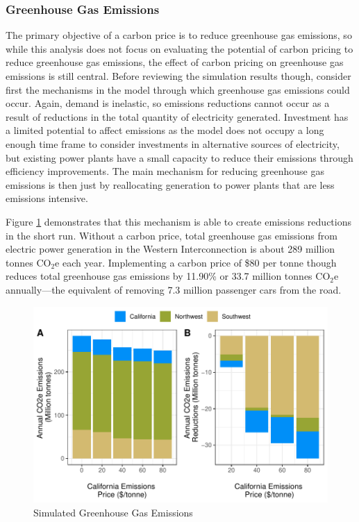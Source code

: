 \subsubsection*{Greenhouse Gas Emissions}

The primary objective of a carbon price is to reduce greenhouse gas emissions, so while this analysis does not focus on evaluating the potential of carbon pricing to reduce greenhouse gas emissions, the effect of carbon pricing on greenhouse gas emissions is still central. Before reviewing the simulation results though, consider first the mechanisms in the model through which greenhouse gas emissions could occur. Again, demand is inelastic, so emissions reductions cannot occur as a result of reductions in the total quantity of electricity generated. Investment has a limited potential to affect emissions as the model does not occupy a long enough time frame to consider investments in alternative sources of electricity, but existing power plants have a small capacity to reduce their emissions through efficiency improvements. The main mechanism for reducing greenhouse gas emissions is then just by reallocating generation to power plants that are less emissions intensive. 

Figure \ref{sim_co2e_bca} demonstrates that this mechanism is able to create emissions reductions in the short run. Without a carbon price, total greenhouse gas emissions from electric power generation in the Western Interconnection is about 289 million tonnes CO$_2$e each year. Implementing a carbon price of \$80 per tonne though reduces total greenhouse gas emissions by 11.90\% or 33.7 million tonnes CO$_2$e annually---the equivalent of removing 7.3 million passenger cars from the road. 

\begin{figure}
    \centering
    \caption{Simulated Greenhouse Gas Emissions\label{sim_co2e_bca}}
    \includegraphics[width=.9\textwidth]{figures/chapter5_figures/sim_co2e_bca.pdf}
\end{figure}

